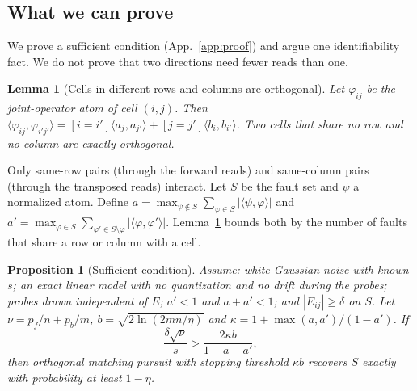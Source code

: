 \documentclass[journal]{IEEEtran}
\newtheorem{lemma}{Lemma}
\newtheorem{proposition}{Proposition}
\begin{document}
\subsection{What we can prove}
\label{sec:proof}
We prove a sufficient condition (App.~\ref{app:proof}) and argue one identifiability fact. We do not prove that two directions need fewer reads than one.

\begin{lemma}[Cells in different rows and columns are orthogonal]\label{lem:orth}
Let $\varphi_{ij}$ be the joint-operator atom of cell $(i,j)$. Then $\langle\varphi_{ij},\varphi_{i'j'}\rangle=[i=i']\langle a_j,a_{j'}\rangle+[j=j']\langle b_i,b_{i'}\rangle$. Two cells that share no row and no column are exactly orthogonal.
\end{lemma}

Only same-row pairs (through the forward reads) and same-column pairs (through the transposed reads) interact. Let $S$ be the fault set and $\psi$ a normalized atom. Define $a=\max_{\psi\notin S}\sum_{\varphi\in S}|\langle\psi,\varphi\rangle|$ and $a'=\max_{\varphi\in S}\sum_{\varphi'\in S\setminus\varphi}|\langle\varphi,\varphi'\rangle|$. Lemma~\ref{lem:orth} bounds both by the number of faults that share a row or column with a cell.

\begin{proposition}[Sufficient condition]\label{prop:suff}
Assume: white Gaussian noise with known $s$; an exact linear model with no quantization and no drift during the probes; probes drawn independent of $E$; $a'<1$ and $a+a'<1$; and $|E_{ij}|\ge\delta$ on $S$. Let $\nu=p_f/n+p_b/m$, $b=\sqrt{2\ln(2mn/\eta)}$ and $\kappa=1+\max(a,a')/(1-a')$. If
\begin{equation}
\frac{\delta\sqrt{\nu}}{s}>\frac{2\kappa b}{1-a-a'},
\end{equation}
then orthogonal matching pursuit with stopping threshold $\kappa b$ recovers $S$ exactly with probability at least $1-\eta$.
\end{proposition}
\end{document}
